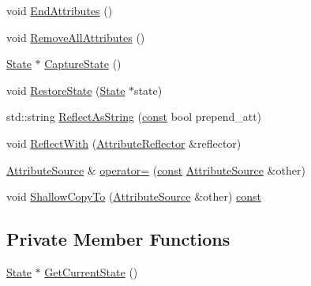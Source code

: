 \begin{DoxyCompactItemize}
\item 
void \mbox{\hyperlink{classlucene_1_1core_1_1util_1_1AttributeSource_a52fad6b087a947622e3f4485357f78b2}{End\+Attributes}} ()
\item 
void \mbox{\hyperlink{classlucene_1_1core_1_1util_1_1AttributeSource_af3f3c9582d3ac28feaa7a455fbb24b80}{Remove\+All\+Attributes}} ()
\item 
\mbox{\hyperlink{classlucene_1_1core_1_1util_1_1AttributeSource_1_1State}{State}} $\ast$ \mbox{\hyperlink{classlucene_1_1core_1_1util_1_1AttributeSource_adb86fb2ab1b48c7643cf7f0f641cb8ce}{Capture\+State}} ()
\item 
void \mbox{\hyperlink{classlucene_1_1core_1_1util_1_1AttributeSource_a1b58ab9c3125d5c6c05ed47e021d455c}{Restore\+State}} (\mbox{\hyperlink{classlucene_1_1core_1_1util_1_1AttributeSource_1_1State}{State}} $\ast$state)
\item 
std\+::string \mbox{\hyperlink{classlucene_1_1core_1_1util_1_1AttributeSource_a666406f74bc169662d4f54020ac7ddab}{Reflect\+As\+String}} (\mbox{\hyperlink{ZlibCrc32_8h_a2c212835823e3c54a8ab6d95c652660e}{const}} bool prepend\+\_\+att)
\item 
void \mbox{\hyperlink{classlucene_1_1core_1_1util_1_1AttributeSource_a2c1c0eeec6866335e6b44e1fa83a97f9}{Reflect\+With}} (\mbox{\hyperlink{namespacelucene_1_1core_1_1util_a7dbb701adaed055f73fb95eec83da10a}{Attribute\+Reflector}} \&reflector)
\item 
\mbox{\hyperlink{classlucene_1_1core_1_1util_1_1AttributeSource}{Attribute\+Source}} \& \mbox{\hyperlink{classlucene_1_1core_1_1util_1_1AttributeSource_acc3081e1437b1c96ddc7671b5088c460}{operator=}} (\mbox{\hyperlink{ZlibCrc32_8h_a2c212835823e3c54a8ab6d95c652660e}{const}} \mbox{\hyperlink{classlucene_1_1core_1_1util_1_1AttributeSource}{Attribute\+Source}} \&other)
\item 
void \mbox{\hyperlink{classlucene_1_1core_1_1util_1_1AttributeSource_a9fd48c63c575c5c69818d3697c17a9a3}{Shallow\+Copy\+To}} (\mbox{\hyperlink{classlucene_1_1core_1_1util_1_1AttributeSource}{Attribute\+Source}} \&other) \mbox{\hyperlink{ZlibCrc32_8h_a2c212835823e3c54a8ab6d95c652660e}{const}}
\end{DoxyCompactItemize}
\subsection*{Private Member Functions}
\begin{DoxyCompactItemize}
\item 
\mbox{\hyperlink{classlucene_1_1core_1_1util_1_1AttributeSource_1_1State}{State}} $\ast$ \mbox{\hyperlink{classlucene_1_1core_1_1util_1_1AttributeSource_a7a8f566041a7140d8ff8d6bea8e45b0f}{Get\+Current\+State}} ()
\end{DoxyCompactItemize}
